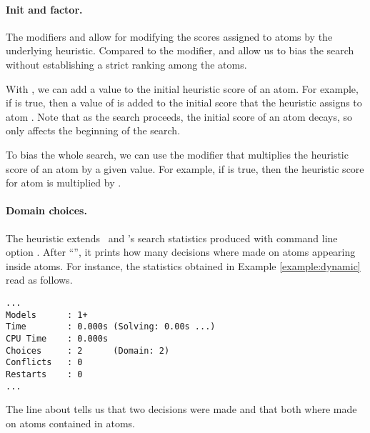 \paragraph{Init and factor.}

The modifiers  and  allow for modifying the scores assigned to atoms by the underlying  heuristic.
Compared to the  modifier, 
 and  allow us to bias the search without establishing a strict ranking among the atoms.

With , we can add a value to the initial heuristic score of an atom.
For example, if  is true, then a value of  is added to
the initial score that the heuristic assigns to atom .
Note that as the search proceeds, the initial score of an atom decays, 
so  only affects the beginning of the search.

To bias the whole search, we can use the  modifier
that multiplies the heuristic score of an atom by a given value.
For example, if  is true, 
then the heuristic score for atom  is multiplied by .

\paragraph{Domain choices.}

The  heuristic extends \clasp\ and \clingo's search statistics produced with command line option .
After ``'', it prints how many decisions where made on atoms appearing inside  atoms.
%
For instance, the statistics obtained in Example \ref{example:dynamic} read as follows.
\begin{lstlisting}[numbers=none]
...
Models      : 1+
Time        : 0.000s (Solving: 0.00s ...)
CPU Time    : 0.000s
Choices     : 2      (Domain: 2)
Conflicts   : 0
Restarts    : 0
...
\end{lstlisting}
The line about  tells us that two decisions were made 
and that both where made on atoms contained in  atoms.

